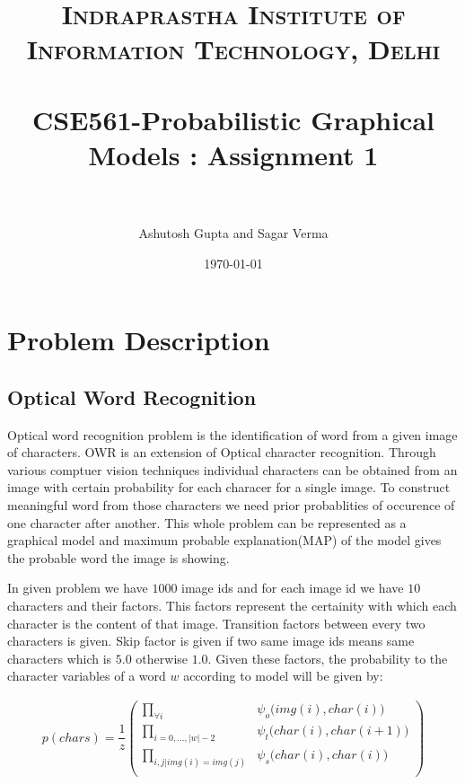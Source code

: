 \documentclass[paper=a4, fontsize=11pt]{scrartcl} %
\title{	
\normalfont \normalsize 
\textsc{Indraprastha Institute of Information Technology, Delhi} \\ [25pt] %
\horrule{0.5pt} \\[0.4cm] %
\huge CSE561-Probabilistic Graphical Models : Assignment 1\\ %
\horrule{2pt} \\[0.5cm] %
}
\author{Ashutosh Gupta and Sagar Verma} %
\date{\normalsize\today} %
\numberwithin{equation}{section} %
\numberwithin{figure}{section} %
\numberwithin{table}{section} %
\begin{document}
\maketitle %


\section{Problem Description}

\subsection{Optical Word Recognition}

\par
Optical word recognition problem is the identification of word from a given image of characters. OWR is an extension of Optical character recognition. Through various comptuer vision techniques individual characters can be obtained from an image with certain probability for each characer for a single image. To construct meaningful word from those characters we need prior probablities of occurence of one character after another. This whole problem can be represented as a graphical model and maximum probable explanation(MAP) of the model gives the probable word the image is showing. 

\par
In given problem we have $1000$ image ids and for each image id we have $10$ characters and their factors. This factors represent the certainity with which each character is the content of that image. Transition factors between every two characters is given. Skip factor is given if two same image ids means same characters which is $5.0$ otherwise $1.0$. Given these factors, the probability to the character variables of a word $w$ according to model will be given by:


\begin{align*}
			p(chars) = \dfrac{1}{z} \begin{pmatrix}
										 \displaystyle \prod_{\forall i}^{} & \psi_{o}\big(img(i),char(i)\big) \\
										 \displaystyle \prod_{i=0,...,|w|-2}^{} & \psi_{t}\big(char(i),char(i+1)\big) \\
										 \displaystyle \prod_{i,j|img(i)=img(j)}^{} & \psi_{s}\big(char(i),char(i)\big) \\
									\end{pmatrix}
\end{align*}
\end{document}
